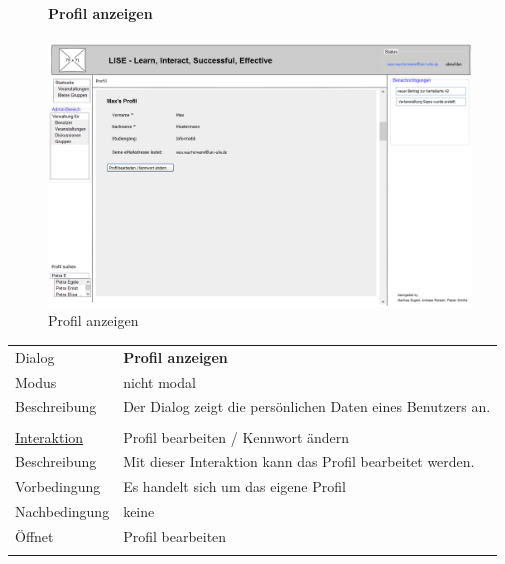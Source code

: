 \documentclass[12pt,a4paper]{article}
\begin{document}
{\begin{figure}[H]
	\paragraph{Profil anzeigen}
	\includegraphics[width=\textwidth]{Bilder/Mockups/GUI/ProfilAnzeigen.png}
	\caption{Profil anzeigen}
	\label{ProfilAnzeigen}
\end{figure}
\begin{tabular}{l p{12cm}}
Dialog 	 & \textbf{Profil anzeigen} \\ 
Modus & nicht modal\\ 
Beschreibung   	 & Der Dialog zeigt die persönlichen Daten eines Benutzers an.\\\\

\underline{Interaktion} 	 & Profil bearbeiten / Kennwort ändern\\ 
Beschreibung   	 & Mit dieser Interaktion kann das Profil bearbeitet werden.\\
Vorbedingung	& Es handelt sich um das eigene Profil \\
Nachbedingung	& keine \\
Öffnet			& \glqq Profil bearbeiten\grqq \\\\
\end{tabular}\\\\

\begin{figure}[H]
	\centering

\end{figure}}
\end{document}
